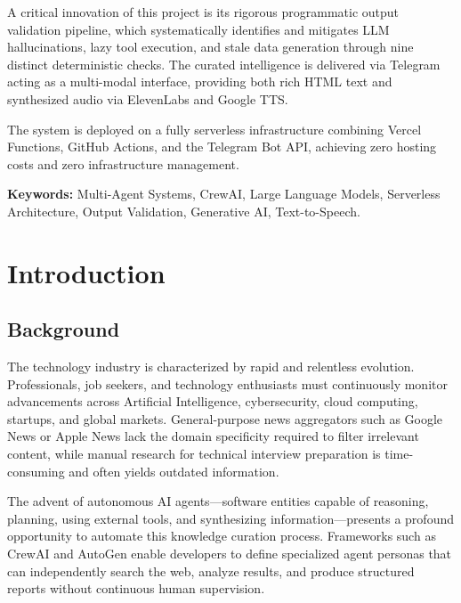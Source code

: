 \documentclass[12pt,a4paper]{report}
\begin{document}
A critical innovation of this project is its rigorous programmatic output validation pipeline, which systematically identifies and mitigates LLM hallucinations, lazy tool execution, and stale data generation through nine distinct deterministic checks. The curated intelligence is delivered via Telegram acting as a multi-modal interface, providing both rich HTML text and synthesized audio via ElevenLabs and Google TTS.

The system is deployed on a fully serverless infrastructure combining Vercel Functions, GitHub Actions, and the Telegram Bot API, achieving zero hosting costs and zero infrastructure management.

\textbf{Keywords:} Multi-Agent Systems, CrewAI, Large Language Models, Serverless Architecture, Output Validation, Generative AI, Text-to-Speech.

\tableofcontents
\listoftables

\chapter{Introduction}

\section{Background}
The technology industry is characterized by rapid and relentless evolution. Professionals, job seekers, and technology enthusiasts must continuously monitor advancements across Artificial Intelligence, cybersecurity, cloud computing, startups, and global markets. General-purpose news aggregators such as Google News or Apple News lack the domain specificity required to filter irrelevant content, while manual research for technical interview preparation is time-consuming and often yields outdated information.

The advent of autonomous AI agents---software entities capable of reasoning, planning, using external tools, and synthesizing information---presents a profound opportunity to automate this knowledge curation process. Frameworks such as CrewAI and AutoGen enable developers to define specialized agent personas that can independently search the web, analyze results, and produce structured reports without continuous human supervision.
\end{document}
